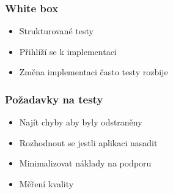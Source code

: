     \subsubsection{White box}
      \begin{itemize}
        \item Strukturované testy
        \item Přihlíží se k implementaci
        \item Změna implementaci často testy rozbije
      \end{itemize}

    \subsubsection{Požadavky na testy}
      \begin{itemize}
        \item Najít chyby aby byly odstraněny
        \item Rozhodnout se jestli aplikaci nasadit
        \item Minimalizovat náklady na podporu
        \item Měření kvality
      \end{itemize}
